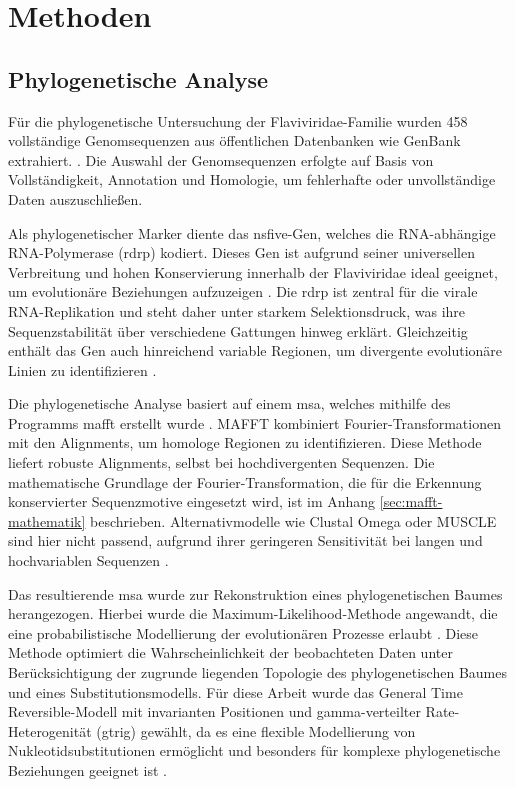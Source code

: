 \chapter{Methoden} \label{chap:methoden}

\section{Phylogenetische Analyse} \label{sec:phylogenetische-analyse}

Für die phylogenetische Untersuchung der Flaviviridae-Familie wurden 458 vollständige Genomsequenzen aus öffentlichen Datenbanken wie GenBank extrahiert. \autocite{mifsudMappingGlycoproteinStructure2024}. Die Auswahl der Genomsequenzen erfolgte auf Basis von Vollständigkeit, Annotation und Homologie, um fehlerhafte oder unvollständige Daten auszuschließen.

Als phylogenetischer Marker diente das \gls{nsfive}-Gen, welches die RNA-abhängige RNA-Polymerase (\gls{rdrp}) kodiert. Dieses Gen ist aufgrund seiner universellen Verbreitung und hohen Konservierung innerhalb der Flaviviridae ideal geeignet, um evolutionäre Beziehungen aufzuzeigen \autocite{Koonin1991}. Die \gls{rdrp} ist zentral für die virale RNA-Replikation und steht daher unter starkem Selektionsdruck, was ihre Sequenzstabilität über verschiedene Gattungen hinweg erklärt. Gleichzeitig enthält das Gen auch hinreichend variable Regionen, um divergente evolutionäre Linien zu identifizieren \autocite{Nguyen2015}.

Die phylogenetische Analyse basiert auf einem \gls{msa}, welches mithilfe des Programms \gls{mafft} erstellt wurde \autocite{Katoh2013}. MAFFT kombiniert Fourier-Transformationen mit den Alignments, um homologe Regionen zu identifizieren. Diese Methode liefert robuste Alignments, selbst bei hochdivergenten Sequenzen. Die mathematische Grundlage der Fourier-Transformation, die für die Erkennung konservierter Sequenzmotive eingesetzt wird, ist im Anhang \ref{sec:mafft-mathematik} beschrieben. Alternativmodelle wie Clustal Omega oder MUSCLE sind hier nicht passend, aufgrund ihrer geringeren Sensitivität bei langen und hochvariablen Sequenzen \autocite{edgarMUSCLEMultipleSequence2004}.

Das resultierende \gls{msa} wurde zur Rekonstruktion eines phylogenetischen Baumes herangezogen. Hierbei wurde die Maximum-Likelihood-Methode angewandt, die eine probabilistische Modellierung der evolutionären Prozesse erlaubt \autocite{felsensteinEvolutionaryTreesDNA1981}. Diese Methode optimiert die Wahrscheinlichkeit der beobachteten Daten unter Berücksichtigung der zugrunde liegenden Topologie des phylogenetischen Baumes und eines Substitutionsmodells. Für diese Arbeit wurde das General Time Reversible-Modell mit invarianten Positionen und gamma-verteilter Rate-Heterogenität (\gls{gtrig}) gewählt, da es eine flexible Modellierung von Nukleotidsubstitutionen ermöglicht und besonders für komplexe phylogenetische Beziehungen geeignet ist \autocite{Tavare1986}.

